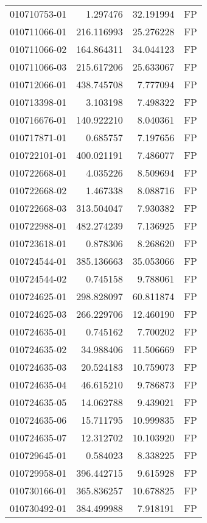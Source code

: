 \begin{tabular}{lrrl}
010710753-01 &    1.297476 &    32.191994 &   FP \\
010711066-01 &  216.116993 &    25.276228 &   FP \\
010711066-02 &  164.864311 &    34.044123 &   FP \\
010711066-03 &  215.617206 &    25.633067 &   FP \\
010712066-01 &  438.745708 &     7.777094 &   FP \\
010713398-01 &    3.103198 &     7.498322 &   FP \\
010716676-01 &  140.922210 &     8.040361 &   FP \\
010717871-01 &    0.685757 &     7.197656 &   FP \\
010722101-01 &  400.021191 &     7.486077 &   FP \\
010722668-01 &    4.035226 &     8.509694 &   FP \\
010722668-02 &    1.467338 &     8.088716 &   FP \\
010722668-03 &  313.504047 &     7.930382 &   FP \\
010722988-01 &  482.274239 &     7.136925 &   FP \\
010723618-01 &    0.878306 &     8.268620 &   FP \\
010724544-01 &  385.136663 &    35.053066 &   FP \\
010724544-02 &    0.745158 &     9.788061 &   FP \\
010724625-01 &  298.828097 &    60.811874 &   FP \\
010724625-03 &  266.229706 &    12.460190 &   FP \\
010724635-01 &    0.745162 &     7.700202 &   FP \\
010724635-02 &   34.988406 &    11.506669 &   FP \\
010724635-03 &   20.524183 &    10.759073 &   FP \\
010724635-04 &   46.615210 &     9.786873 &   FP \\
010724635-05 &   14.062788 &     9.439021 &   FP \\
010724635-06 &   15.711795 &    10.999835 &   FP \\
010724635-07 &   12.312702 &    10.103920 &   FP \\
010729645-01 &    0.584023 &     8.338225 &   FP \\
010729958-01 &  396.442715 &     9.615928 &   FP \\
010730166-01 &  365.836257 &    10.678825 &   FP \\
010730492-01 &  384.499988 &     7.918191 &   FP \\

\end{tabular}
